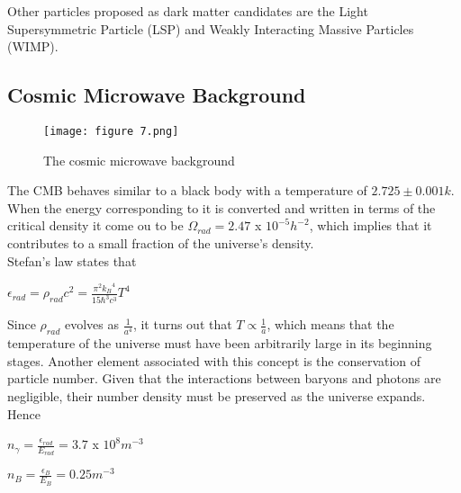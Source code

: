 Other particles proposed as dark matter candidates are the Light Supersymmetric Particle (LSP) and Weakly Interacting Massive Particles (WIMP).

\subsection{Cosmic Microwave Background}

\begin{figure}[H]
    \centering
    \texttt{[image: figure 7.png]}
    \caption{The cosmic microwave background}
    \label{fig:CMB}
\end{figure}

The CMB behaves similar to a black body with a temperature of $2.725 \pm 0.001 k$. When the energy corresponding to it is converted and written in terms of the critical density it come ou to be $\Omega_{rad} = 2.47$ x $10^{-5} h^{-2}$, which implies that it contributes to a small fraction of the universe's density.
\\
Stefan's law states that
\begin{center}
    $\epsilon_{rad} = \rho_{rad}c^2 = \frac{{\pi}^2{k_B}^4}{15{\hbar}^3c^3}T^4$
\end{center}

Since $\rho_{rad}$ evolves as $\frac{1}{a^4}$, it turns out that $T \propto \frac{1}{a}$, which means that the temperature of the universe must have been arbitrarily large in its beginning stages. Another element associated with this concept is the conservation of particle number. Given that the interactions between baryons and photons are negligible, their number density must be preserved as the universe expands. Hence 

\begin{center}
    $n_{\gamma} = \frac{\epsilon_{rad}}{E_{rad}} = 3.7$ x $10^8 m^{-3}$
\end{center}

\begin{center}
    $n_{B} = \frac{\epsilon_{B}}{E_{B}} = 0.25 m^{-3}$ 
\end{center}

